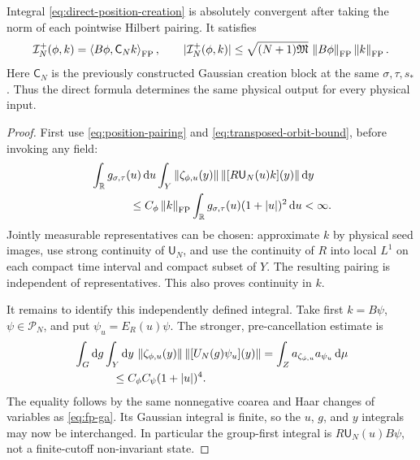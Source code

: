 \begin{theorem}
Integral \eqref{eq:direct-position-creation} is absolutely convergent
after taking the norm of each pointwise Hilbert pairing. It satisfies
\begin{equation}
 \mathcal I_N^+(\phi,k)
 =\left\langle B\phi,\mathsf C_N k\right\rangle_{\mathrm{FP}},
 \qquad
 |\mathcal I_N^+(\phi,k)|
 \le\sqrt{(N+1)\mathfrak M}\,
       \left\lVert B\phi\right\rVert_{\mathrm{FP}}\left\lVert k\right\rVert_{\mathrm{FP}}.
 \label{eq:direct-position-identified}
\end{equation}
Here $\mathsf C_N$ is the previously constructed Gaussian creation
block at the same $\sigma,\tau,s_*$. Thus the direct formula determines
the same physical output for every physical input.
\label{thm:direct-position}
\end{theorem}
\begin{proof}
First use \eqref{eq:position-pairing} and
\eqref{eq:transposed-orbit-bound}, before invoking any field:
\begin{align}
 &\int_{\mathbb R}g_{\sigma,\tau}(u)\dd u
 \int_Y\norm{\zeta_{\phi,u}(y)}
          \norm{[R\mathsf U_N(u)k](y)}\dd y\notag\\
 &\hspace{12mm}\le C_\phi\norm k_{\FP}
       \int_{\mathbb R}g_{\sigma,\tau}(u)(1+|u|)^2\dd u<\infty.
 \label{eq:direct-absolute-bound}
\end{align}
Jointly measurable representatives can be chosen: approximate $k$
by physical seed images, use strong continuity of $\mathsf U_N$,
and use the continuity of $R$ into local $L^1$ on each compact
time interval and compact subset of $Y$. The resulting pairing is
independent of representatives. This also proves continuity in $k$.

It remains to identify this independently defined integral.
Take first $k=B\psi$, $\psi\in\mathcal P_N$, and put
$\psi_u=E_R(u)\psi$. The stronger, pre-cancellation estimate is
\begin{align}
 &\int_G\dd g\int_Y\dd y\,
     \norm{\zeta_{\phi,u}(y)}\norm{[U_N(g)\psi_u](y)}
   =\int_Z a_{\zeta_{\phi,u}}a_{\psi_u}\dd\mu\notag\\
 &\hspace{12mm}\le C_\phi C_\psi(1+|u|)^4 .
 \label{eq:triple-fubini-bound}
\end{align}
The equality follows by the same nonnegative coarea and Haar changes of
variables as \eqref{eq:fp-ga}. Its Gaussian integral is finite, so
the $u$, $g$, and $y$ integrals may now be interchanged.
In particular the group-first integral is
$R\mathsf U_N(u)B\psi$, not a finite-cutoff non-invariant state.


\end{proof}
